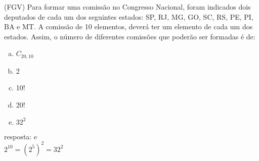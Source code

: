 \begin{ex}
	(FGV) Para formar uma comissão no Congresso Nacional, foram indicados dois deputados de cada um dos seguintes estados: SP, RJ, MG, GO, SC, RS, PE, PI, BA e MT. A comissão de 10 elementos, deverá ter um elemento de cada um dos estados. Assim, o número de diferentes comissões que poderão ser formadas é de:
    \begin{enumerate}[(a)]
    \item $C_{20,10} $
    \item 2
    \item 10!
    \item 20!
    \item $32^2$
    \end{enumerate}
      \begin{sol}
        resposta: e \\
        $2^{10}=(2^5)^2=32^2$
      \end{sol}
\end{ex}